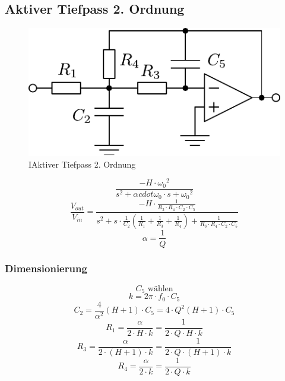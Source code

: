 



\subsection{Aktiver Tiefpass 2. Ordnung}
\begin{figure}[h!]
	\centering
	\includegraphics[scale=\schscale]{op_tp_o2.pdf}
	\caption{IAktiver Tiefpass 2. Ordnung}
	\label{sch:op-tp-o2}
\end{figure}
\[ \frac{-H \cdot {\omega_0}^2}
{s^2 + \alpha cdot \omega_0 \cdot s + {\omega_0}^2} \]
\[ \frac{V_{out}}{V_{in}} 
= \frac{-H \cdot \frac{1}{R_3 \cdot R_4 \cdot C_2 \cdot C_5}}
{s^2 + s \cdot \frac{1}{C_2} 
\left(\frac{1}{R_1} + \frac{1}{R_3} + \frac{1}{R_4}\right) 
+ \frac{1}{R_3 \cdot R_4 \cdot C_2 \cdot C_5}} \]
\[ \alpha = \frac{1}{Q} \]

\subsubsection{Dimensionierung}
\[ C_5 \text{ wählen} \]
\[ k = 2 \pi \cdot f_0 \cdot C_5 \]
\[ C_2 = \frac{4}{\alpha^2} (H + 1) \cdot C_5 
= 4 \cdot Q^2 (H + 1) \cdot C_5 \]
\[ R_1 = \frac{\alpha}{2 \cdot H \cdot k} 
= \frac{1}{2 \cdot Q \cdot H \cdot k} \]
\[ R_3 = \frac{\alpha}{2 \cdot (H + 1) \cdot k} 
= \frac{1}{2 \cdot Q \cdot (H + 1) \cdot k} \]
\[ R_4 = \frac{\alpha}{2 \cdot k} = \frac{1}{2 \cdot Q \cdot k} \]